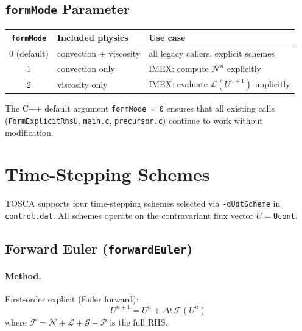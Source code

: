 \documentclass[12pt,a4paper]{article}
\newcommand{\cN}{\mathcal{N}}
\newcommand{\cL}{\mathcal{L}}
\newcommand{\cP}{\mathcal{P}}
\newcommand{\cS}{\mathcal{S}}
\newcommand{\dt}{\Delta t}
\begin{document}
	\subsection{\texttt{formMode} Parameter}
	
	\begin{center}
		\begin{tabular}{cll}
			\toprule
			\texttt{formMode} & Included physics & Use case \\
			\midrule
			0 (default) & convection + viscosity & all legacy callers, explicit schemes \\
			1 & convection only & IMEX: compute $\cN^n$ explicitly \\
			2 & viscosity only  & IMEX: evaluate $\cL(U^{n+1})$ implicitly \\
			\bottomrule
		\end{tabular}
	\end{center}
	
	\begin{notebox}
		The C++ default argument \texttt{formMode = 0} ensures that all
		existing calls (\texttt{FormExplicitRhsU}, \texttt{main.c},
		\texttt{precursor.c}) continue to work without modification.
	\end{notebox}
	
	\section{Time-Stepping Schemes}
	
	TOSCA supports four time-stepping schemes selected via
	\texttt{-dUdtScheme} in \texttt{control.dat}. All schemes operate on
	the contravariant flux vector $U = $\texttt{Ucont}.
	
	\subsection{Forward Euler (\texttt{forwardEuler})}
	
	\paragraph{Method.}
	First-order explicit (Euler forward):
	\begin{equation}
		U^{n+1} = U^n + \dt\,\mathcal{F}(U^n)
	\end{equation}
	where $\mathcal{F} = \cN + \cL + \cS - \cP$ is the full RHS.
	
\end{document}
